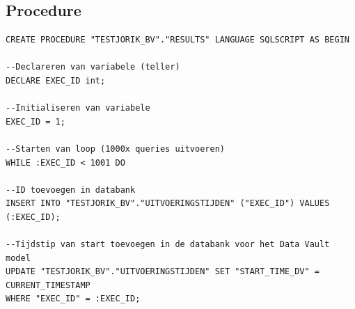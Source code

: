 \subsection{Procedure} 
\begin{lstlisting}[frame=single] 
CREATE PROCEDURE "TESTJORIK_BV"."RESULTS" LANGUAGE SQLSCRIPT AS BEGIN

--Declareren van variabele (teller)
DECLARE EXEC_ID int;

--Initialiseren van variabele
EXEC_ID = 1;

--Starten van loop (1000x queries uitvoeren)
WHILE :EXEC_ID < 1001 DO

--ID toevoegen in databank
INSERT INTO "TESTJORIK_BV"."UITVOERINGSTIJDEN" ("EXEC_ID") VALUES (:EXEC_ID);

--Tijdstip van start toevoegen in de databank voor het Data Vault model
UPDATE "TESTJORIK_BV"."UITVOERINGSTIJDEN" SET "START_TIME_DV" = CURRENT_TIMESTAMP
WHERE "EXEC_ID" = :EXEC_ID;


\end{lstlisting}
